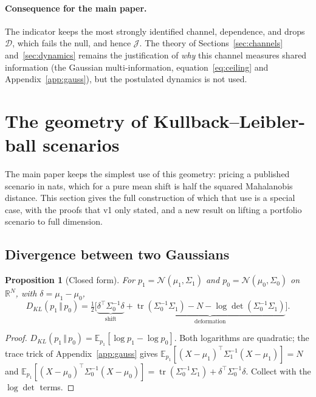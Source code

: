 \documentclass[11pt]{article}
\newtheorem{proposition}{Proposition}
\theoremstyle{definition}
\theoremstyle{remark}
\newcommand{\JJ}{\mathcal{J}}
\newcommand{\DD}{\mathcal{D}}
\newcommand{\KL}[2]{D_{KL}\!\left(#1\,\Vert\,#2\right)}
\begin{document}
\paragraph{Consequence for the main paper.} The indicator keeps the most
strongly identified channel, dependence, and drops $\DD$, which fails the null,
and hence $\JJ$. The theory of
Sections~\ref{sec:channels} and~\ref{sec:dynamics} remains the justification of
\emph{why} this channel measures shared information (the Gaussian
multi-information, equation~\eqref{eq:ceiling} and Appendix~\ref{app:gauss}),
but the postulated dynamics is not used.

\section{The geometry of Kullback--Leibler-ball scenarios}
\label{sec:stress}

The main paper keeps the simplest use of this geometry: pricing a published
scenario in nats, which for a pure mean shift is half the squared Mahalanobis
distance. This section gives the full construction of which that use is a
special case, with the proofs that v1 only stated, and a new result on lifting a
portfolio scenario to full dimension.

\subsection{Divergence between two Gaussians}

\begin{proposition}[Closed form]
\label{prop:klgauss}
For $p_1=\mathcal N(\mu_1,\Sigma_1)$ and $p_0=\mathcal N(\mu_0,\Sigma_0)$ on
$\mathbb R^N$, with $\delta=\mu_1-\mu_0$,
\begin{equation}
\label{eq:klgauss}
\KL{p_1}{p_0}=\tfrac12\Big[\underbrace{\delta^\top\Sigma_0^{-1}\delta}_{\text{shift}}
+\underbrace{\operatorname{tr}(\Sigma_0^{-1}\Sigma_1)-N-\log\det(\Sigma_0^{-1}\Sigma_1)}_{\text{deformation}}\Big].
\end{equation}
\end{proposition}

\begin{proof}
$\KL{p_1}{p_0}=\mathbb E_{p_1}[\log p_1-\log p_0]$. Both logarithms are
quadratic; the trace trick of Appendix~\ref{app:gauss} gives
$\mathbb E_{p_1}[(X-\mu_1)^\top\Sigma_1^{-1}(X-\mu_1)]=N$ and
$\mathbb E_{p_1}[(X-\mu_0)^\top\Sigma_0^{-1}(X-\mu_0)]
=\operatorname{tr}(\Sigma_0^{-1}\Sigma_1)+\delta^\top\Sigma_0^{-1}\delta$.
Collect with the $\log\det$ terms.
\end{proof}
\end{document}
